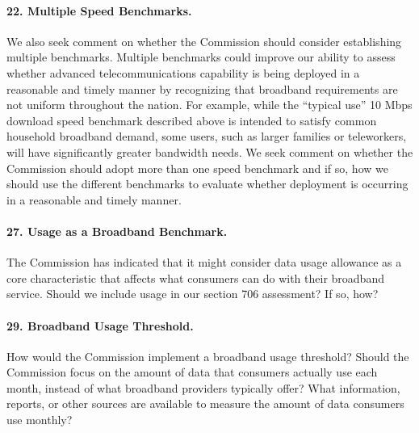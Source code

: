 \paragraph{22. Multiple Speed Benchmarks.} We also seek comment on whether the Commission
should consider establishing multiple benchmarks. Multiple benchmarks could improve our ability
to assess whether advanced telecommunications capability is being deployed in a reasonable
and timely manner by recognizing that broadband requirements are not uniform throughout the 
nation. For example, while the ``typical use'' 10 Mbps download speed benchmark described 
above is intended to satisfy common household broadband demand, some users, such as larger 
families or teleworkers, will have significantly greater bandwidth needs. We seek comment 
on whether the Commission should adopt more than one speed benchmark and if so, how we 
should use the different benchmarks to evaluate whether deployment is occurring in a 
reasonable and timely manner.

\paragraph{27. Usage as a Broadband Benchmark.} The Commission has indicated that it might consider
data usage allowance as a core characteristic that affects what consumers can do with their broadband
service.
Should we include usage in our section 706 assessment? If so, how?

\paragraph{29. Broadband Usage Threshold. } How would the Commission implement a broadband usage
threshold? Should the Commission focus on the amount of data that consumers actually use each month,
instead of what broadband providers typically offer? What information, reports, or other sources are
available to measure the amount of data consumers use monthly?

